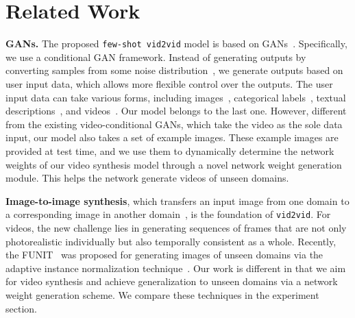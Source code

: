 \documentclass{article}
\newcommand{\vidtovid}{{\texttt{vid2vid}}\xspace}
\newcommand{\fewshotvidtovid}{{\texttt{few-shot vid2vid}}\xspace}
\begin{document}
\section{Related Work} \label{sec::rel}
\vspace{-3mm}
{\bf GANs.} The proposed \fewshotvidtovid model is based on GANs~\cite{goodfellow2014generative}. Specifically, we use a conditional GAN framework. Instead of generating outputs by converting samples from some noise distribution~\cite{goodfellow2014generative,radford2015unsupervised,liu2016coupled,gulrajani2017improved,karras2018style}, we generate outputs based on user input data, which allows more flexible control over the outputs. The user input data can take various forms, including images~\cite{isola2017image,zhu2017unpaired,liu2016unsupervised,park2019SPADE}, categorical labels~\cite{odena2016conditional,miyato2018cgans,zhang2019self,brock2018large}, textual descriptions~\cite{reed2016generative,zhang2017stackgan,xu2018attngan}, and videos~\cite{chan2018everybody,gafni2019vid2game,wang2018video,zhou2019dance}. Our model belongs to the last one. However, different from the existing video-conditional GANs, which take the video as the sole data input, our model also takes a set of example images. These example images are provided at test time, and we use them to dynamically determine the network weights of our video synthesis model through a novel network weight generation module. This helps the network generate videos of unseen domains.

{\bf Image-to-image synthesis}, which transfers an input image from one domain to a corresponding image in another domain~\cite{isola2017image,taigman2016unsupervised,bousmalis2016unsupervised,shrivastava2016learning,zhu2017unpaired,liu2016unsupervised,huang2018multimodal,zhu2017toward,wang2017high,choi2017stargan,park2019SPADE,liu2019few,benaim2018one}, is the foundation of \vidtovid. For videos, the new challenge lies in generating sequences of frames that are not only photorealistic individually but also temporally consistent as a whole. Recently, the FUNIT~\cite{liu2019few} was proposed for generating images of unseen domains via the adaptive instance normalization technique~\cite{huang2017adain}. Our work is different in that we aim for video synthesis and achieve generalization to unseen domains via a network weight generation scheme. We compare these techniques in the experiment section.
\end{document}
